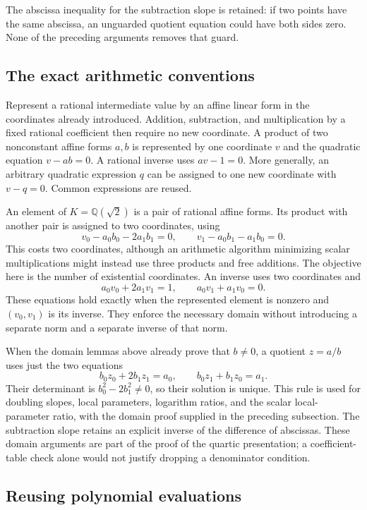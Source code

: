 \documentclass[11pt]{article}
\theoremstyle{definition}
\begin{document}
The abscissa inequality for the subtraction slope is retained: if two
points have the same abscissa, an unguarded quotient equation could have
both sides zero.  None of the preceding arguments removes that guard.


\subsection{The exact arithmetic conventions}

Represent a rational intermediate value by an affine linear form in the
coordinates already introduced.  Addition, subtraction, and multiplication
by a fixed rational coefficient then require no new coordinate.  A product
of two nonconstant affine forms $a,b$ is represented by one coordinate $v$
and the quadratic equation $v-ab=0$.  A rational inverse uses $av-1=0$.
More generally, an arbitrary quadratic expression $q$ can be assigned to
one new coordinate with $v-q=0$.  Common expressions are reused.

An element of $K=\mathbb Q(\sqrt2)$ is a pair of rational affine forms.
Its product with another pair is assigned to two coordinates, using
\[
 v_0-a_0b_0-2a_1b_1=0,\qquad
 v_1-a_0b_1-a_1b_0=0.
\]
This costs two coordinates, although an arithmetic algorithm minimizing
scalar multiplications might instead use three products and free additions.
The objective here is the number of existential coordinates.  An inverse
uses two coordinates and
\[
 a_0v_0+2a_1v_1=1,\qquad a_0v_1+a_1v_0=0.
\]
These equations hold exactly when the represented element is nonzero and
$(v_0,v_1)$ is its inverse.  They enforce the necessary domain without
introducing a separate norm and a separate inverse of that norm.

When the domain lemmas above already prove that $b\ne0$, a quotient
$z=a/b$ uses just the two equations
\[
 b_0z_0+2b_1z_1=a_0,\qquad b_0z_1+b_1z_0=a_1.
\]
Their determinant is $b_0^2-2b_1^2\ne0$, so their solution is unique.
This rule is used for doubling slopes, local parameters, logarithm ratios,
and the scalar local-parameter ratio, with the domain proof supplied in
the preceding subsection.  The subtraction slope retains an explicit
inverse of the difference of abscissas.  These domain arguments are part
of the proof of the quartic presentation; a coefficient-table check alone
would not justify dropping a denominator condition.

\subsection{Reusing polynomial evaluations}
\end{document}
